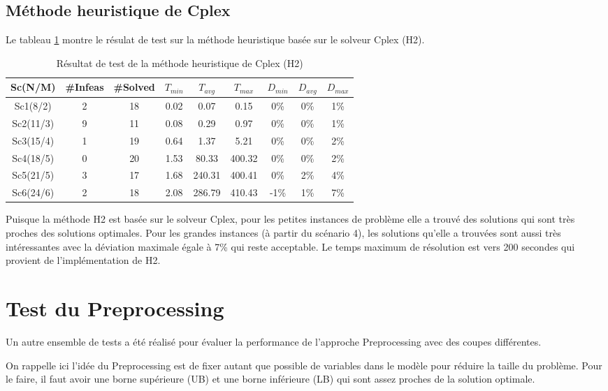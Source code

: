 \documentclass[twoside,fleqn]{EPURapport}
\begin{document}
\section{Méthode heuristique de Cplex}
Le tableau \ref{tab_h2} montre le résulat de test sur la méthode heuristique basée sur le solveur Cplex (H2).


\begin{table}[h]
    \centering
    \begin{tabular}{|c|c|c|c|c|c|c|c|c|}
    	\hline
    	Sc(N/M)	& \#Infeas & \#Solved	& $T_{min}$ & $T_{avg}$	& $T_{max}$ & $D_{min}$ & $D_{avg}$	& $D_{max}$ \\ \hline
		Sc1(8/2)  &2 & 18 &  0.02 &  0.07   &0.15     &0\%  &0\%  &1\% \\ \hline
Sc2(11/3) &9 & 11 &  0.08 &  0.29   &0.97     &0\%  &0\%  &1\% \\ \hline
Sc3(15/4) &1 & 19 &  0.64 &  1.37   &5.21     &0\%  &0\%  &2\% \\ \hline
Sc4(18/5) &0 & 20 &  1.53 &  80.33  & 400.32  &0\%  &0\%  &2\% \\ \hline
Sc5(21/5) &3 & 17 &  1.68 &  240.31 &  400.41 & 0\% & 2\% & 4\% \\ \hline
Sc6(24/6) &2 & 18 &  2.08 &  286.79 &  410.43 & -1\%&  1\%&  7\% \\ \hline
    \end{tabular}
    \caption{Résultat de test de la méthode heuristique de Cplex (H2)}
    \label{tab_h2}
\end{table}
\bigskip


Puisque la méthode H2 est basée sur le solveur Cplex, pour les petites instances de problème elle a trouvé des solutions qui sont très proches des solutions optimales. Pour les grandes instances (à partir du scénario 4), les solutions qu'elle a trouvées sont aussi très intéressantes avec la déviation maximale égale à 7\% qui reste acceptable. Le temps maximum de résolution est vers 200 secondes qui provient de l'implémentation de H2.



\chapter{Test du Preprocessing} 
Un autre ensemble de tests a été réalisé pour évaluer la performance de l'approche Preprocessing avec des coupes différentes.

On rappelle ici l'idée du Preprocessing est de fixer autant que possible de variables dans le modèle pour réduire la taille du problème. Pour le faire, il faut avoir une borne supérieure (UB) et une borne inférieure (LB) qui sont assez proches de la solution optimale.
\end{document}
